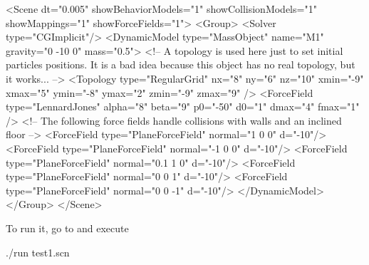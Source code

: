 \begin{code_xml}
<Scene dt="0.005" showBehaviorModels="1" showCollisionModels="1" showMappings="1" showForceFields="1">
	<Group>
		<Solver type="CGImplicit"/>
		<DynamicModel type="MassObject" name="M1" gravity="0 -10 0" mass="0.5">
		<!-- A topology is used here just to set initial particles positions. It is a bad idea because this object has no real topology, but it works... -->
		<Topology type="RegularGrid" nx="8" ny="6" nz="10" xmin="-9" xmax="5" ymin="-8" ymax="2" zmin="-9" zmax="9" />
		<ForceField type="LennardJones" alpha="8" beta="9" p0="-50" d0="1" dmax="4" fmax="1" />
		<!-- The following force fields handle collisions with walls and an inclined floor -->
		<ForceField type="PlaneForceField" normal="1 0 0" d="-10"/>
		<ForceField type="PlaneForceField" normal="-1 0 0" d="-10"/>
		<ForceField type="PlaneForceField" normal="0.1 1 0" d="-10"/>
		<ForceField type="PlaneForceField" normal="0 0 1" d="-10"/>
		<ForceField type="PlaneForceField" normal="0 0 -1" d="-10"/>
		</DynamicModel>
	</Group>
</Scene>
\end{code_xml}

To run it, go to  and execute
\begin{code_bash}
./run test1.scn
\end{code_bash}

